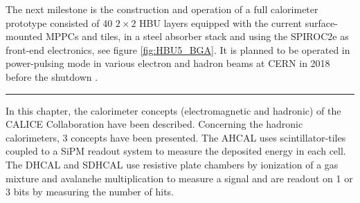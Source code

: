 The next milestone is the construction and operation of a full calorimeter prototype consisted of 40 $2\times2$ HBU layers equipped with the current surface-mounted MPPCs and tiles, in a steel absorber stack and using the SPIROC2e as front-end electronics, see figure \ref{fig:HBU5_BGA}. It is planned to be operated in power-pulsing mode in various electron and hadron beams at CERN in 2018 before the shutdown \cite{Felix:AHCALMain2017}.

\begin{center}
  \rule{0.5\textwidth}{.4pt}
\end{center}

In this chapter, the calorimeter concepts (electromagnetic and hadronic) of the CALICE Collaboration have been described. Concerning the hadronic calorimeters, 3 concepts have been presented. The AHCAL uses scintillator-tiles coupled to a SiPM readout system to measure the deposited energy in each cell. The DHCAL and SDHCAL use resistive plate chambers by ionization of a gas mixture and avalanche multiplication to measure a signal and are readout on 1 or 3 bits by measuring the number of hits.
